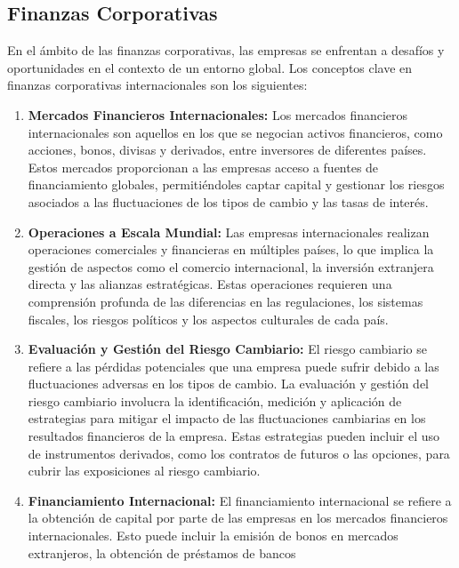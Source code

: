 \documentclass[
  a4paper,
]{article}
\begin{document}
\hypertarget{finanzas-corporativas}{%
\subsection{Finanzas Corporativas}\label{finanzas-corporativas}}

En el ámbito de las finanzas corporativas, las empresas se enfrentan a
desafíos y oportunidades en el contexto de un entorno global. Los
conceptos clave en finanzas corporativas internacionales son los
siguientes:

\begin{enumerate}
\def\labelenumi{\arabic{enumi}.}
\item
  \textbf{Mercados Financieros Internacionales:} Los mercados
  financieros internacionales son aquellos en los que se negocian
  activos financieros, como acciones, bonos, divisas y derivados, entre
  inversores de diferentes países. Estos mercados proporcionan a las
  empresas acceso a fuentes de financiamiento globales, permitiéndoles
  captar capital y gestionar los riesgos asociados a las fluctuaciones
  de los tipos de cambio y las tasas de interés.
\item
  \textbf{Operaciones a Escala Mundial:} Las empresas internacionales
  realizan operaciones comerciales y financieras en múltiples países, lo
  que implica la gestión de aspectos como el comercio internacional, la
  inversión extranjera directa y las alianzas estratégicas. Estas
  operaciones requieren una comprensión profunda de las diferencias en
  las regulaciones, los sistemas fiscales, los riesgos políticos y los
  aspectos culturales de cada país.
\item
  \textbf{Evaluación y Gestión del Riesgo Cambiario:} El riesgo
  cambiario se refiere a las pérdidas potenciales que una empresa puede
  sufrir debido a las fluctuaciones adversas en los tipos de cambio. La
  evaluación y gestión del riesgo cambiario involucra la identificación,
  medición y aplicación de estrategias para mitigar el impacto de las
  fluctuaciones cambiarias en los resultados financieros de la empresa.
  Estas estrategias pueden incluir el uso de instrumentos derivados,
  como los contratos de futuros o las opciones, para cubrir las
  exposiciones al riesgo cambiario.
\item
  \textbf{Financiamiento Internacional:} El financiamiento internacional
  se refiere a la obtención de capital por parte de las empresas en los
  mercados financieros internacionales. Esto puede incluir la emisión de
  bonos en mercados extranjeros, la obtención de préstamos de bancos

\end{enumerate}
\end{document}
